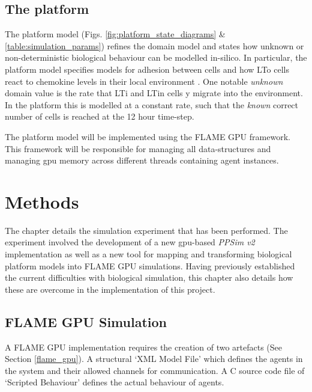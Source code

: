 \documentclass{UoYCSproject}
\begin{document}
\section{The \gls{platform}}
The platform model (Figs. \ref{fig:platform_state_diagrams} \& \ref{table:simulation_params}) refines the domain model and states how unknown or non-deterministic biological behaviour can be modelled \gls{in-silico}.
In particular, the platform model specifies models for adhesion between cells and how \gls{LTo} cells react to chemokine levels in their local environment \cite{kieran_thesis, kieran_methodology}.
One notable \textit{unknown} domain value is the rate that \gls{LTi} and \gls{LTin} cells y migrate into the environment.
In the \gls{platform} this is modelled at a constant rate, such that the \textit{known} correct number of cells is reached at the 12 hour time-step.

The platform model will be implemented using the \gls{FLAME GPU} framework.
This framework will be responsible for managing all data-structures and managing \gls{gpu} memory across different threads containing agent instances.


\chapter{Methods}
\label{methods}

The chapter details the simulation experiment that has been performed.
The experiment involved the development of a new \acrshort{gpu}-based \textit{PPSim v2} implementation as well as a new tool for mapping and transforming biological platform models into \gls{FLAME GPU} simulations.
Having previously established the current difficulties with biological simulation, this chapter also details how these are overcome in the implementation of this project.

\section{\gls{FLAME GPU} Simulation}
\label{ppsim_v2}
A \gls{FLAME GPU} implementation requires the creation of two artefacts (See Section \ref{flame_gpu}).
A structural `XML Model File' which defines the agents in the system and their allowed channels for communication.
A C source code file of `Scripted Behaviour' defines the actual behaviour of agents.
\end{document}
